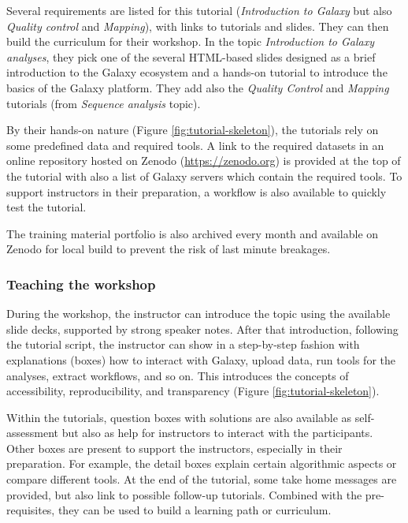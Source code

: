 \documentclass[10pt,letterpaper]{article}
\begin{document}
Several requirements are listed for this tutorial (\textit{Introduction to Galaxy} but also \textit{Quality control} and \textit{Mapping}), with links to tutorials and slides. They can then build the curriculum for their workshop. In the topic \emph{Introduction to Galaxy analyses}, they pick one of the several HTML-based slides designed as a brief introduction to the Galaxy ecosystem and a hands-on tutorial to introduce the basics of the Galaxy platform. They add also the \emph{Quality Control} and \emph{Mapping} tutorials (from \emph{Sequence analysis} topic).

By their hands-on nature (Figure \ref{fig:tutorial-skeleton}), the tutorials rely on some predefined data and required tools. 
A link to the required datasets in an online repository hosted on Zenodo (\url{https://zenodo.org}) is provided at the top of the tutorial with also a list of Galaxy servers which contain the required tools. To support instructors in their preparation,  a workflow is also available to quickly test the tutorial.

The training material portfolio is also archived every month and available on Zenodo for local build to prevent the risk of last minute breakages.

\subsubsection*{Teaching the workshop}

During the workshop, the instructor can introduce the topic using the available slide decks, supported by strong speaker notes. After that introduction, following the tutorial script, the instructor can show in a step-by-step fashion with explanations (boxes) how to interact with Galaxy, upload data, run tools for the analyses, extract workflows, and so on. This introduces the concepts of accessibility, reproducibility, and transparency (Figure \ref{fig:tutorial-skeleton}). 

Within the tutorials, question boxes with solutions are also available as self-assessment but also as help for instructors to interact with the participants. Other boxes are present to support the instructors, especially in their preparation.
For example, the detail boxes explain certain algorithmic aspects or compare different tools.
At the end of the tutorial, some take home messages are provided, but also link to possible follow-up tutorials.
Combined with the pre-requisites, they can be used to build a learning path or curriculum.
\end{document}
